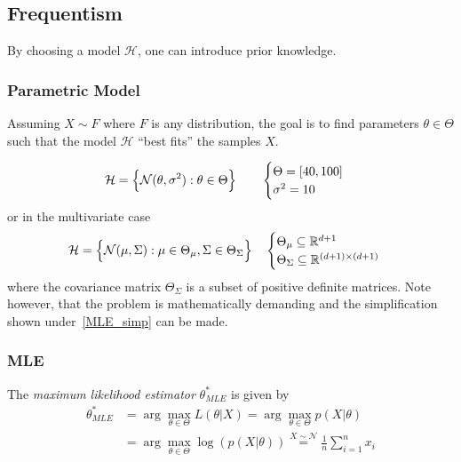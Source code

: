 \subsection{Frequentism}
By choosing a model $\mathcal{H}$, one can introduce prior knowledge.

\subsubsection{Parametric Model}
Assuming $X\sim F$ where $F$ is any distribution, the goal is to find parameters $\theta\in\Theta$ such that the model $\mathcal{H}$ ``best fits'' the samples $X$.

\begin{examplesection}[Example]
    \noindent\begin{equation*}
        \mathcal{H}=\Bigl\{\mathcal{N}(\theta, \sigma^2): \theta\in\Theta\Bigr\}\qquad \begin{cases}
            \Theta = [40,100] \\
            \sigma^2 = 10
        \end{cases}
    \end{equation*}
    or in the multivariate case
    \noindent\begin{equation*}
        \mathcal{H}=\Bigl\{\mathcal{N}(\mu, \Sigma): \mu\in\Theta_\mu, \Sigma\in\Theta_\Sigma\Bigr\}\quad \begin{cases}
            \Theta_\mu\subseteq \mathbb{R}^{d+1} \\
            \Theta_\Sigma\subseteq \mathbb{R}^{(d+1)\times (d+1)}
        \end{cases}
    \end{equation*}
    where the covariance matrix $\Theta_\Sigma$ is a subset of positive definite matrices. Note however, that the problem is mathematically demanding and the simplification shown under~\ref{MLE_simp} can be made.
\end{examplesection}


\subsubsection{MLE}
The \textit{maximum likelihood estimator} $\theta^*_{MLE}$ is given by
\noindent\begin{align*}
    \theta^*_{MLE} & = \arg\max_{\theta\in\Theta} L(\theta|X) =   \arg\max_{\theta\in\Theta} p(X|\theta)                         \\
                   & = \arg\max_{\theta\in\Theta} \log(p(X|\theta)) \overset{X\sim\mathcal{N}}{=} \frac{1}{n} \sum_{i=1}^{n} x_i
\end{align*}


